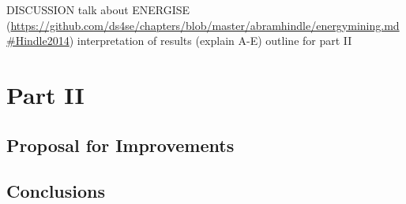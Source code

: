 \documentclass{article}
\begin{document}
DISCUSSION
    talk about ENERGISE (\url{https://github.com/ds4se/chapters/blob/master/abramhindle/energymining.md#Hindle2014})
    interpretation of results (explain A-E)
    outline for part II



\section{Part II}

\subsection{Proposal for Improvements}

\subsection{Conclusions}



\end{document}
